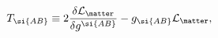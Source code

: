 \begin{equation}
\label{eq:tmunumatt}
T_{\si{AB}} \equiv 2{\delta {\cal L}_{\matter} \over \delta
g^{\si{AB}}} - g_{\si{AB}} {\cal L}_{\matter},
\end{equation}

